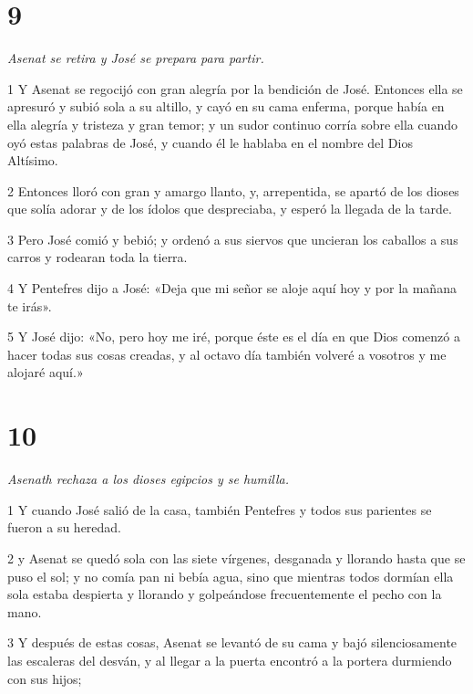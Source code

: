 \chapter{9}

\par \textit{Asenat se retira y José se prepara para partir.}

\par 1 Y Asenat se regocijó con gran alegría por la bendición de José. Entonces ella se apresuró y subió sola a su altillo, y cayó en su cama enferma, porque había en ella alegría y tristeza y gran temor; y un sudor continuo corría sobre ella cuando oyó estas palabras de José, y cuando él le hablaba en el nombre del Dios Altísimo.

\par 2 Entonces lloró con gran y amargo llanto, y, arrepentida, se apartó de los dioses que solía adorar y de los ídolos que despreciaba, y esperó la llegada de la tarde.

\par 3 Pero José comió y bebió; y ordenó a sus siervos que uncieran los caballos a sus carros y rodearan toda la tierra.

\par 4 Y Pentefres dijo a José: «Deja que mi señor se aloje aquí hoy y por la mañana te irás».

\par 5 Y José dijo: «No, pero hoy me iré, porque éste es el día en que Dios comenzó a hacer todas sus cosas creadas, y al octavo día también volveré a vosotros y me alojaré aquí.»

\chapter{10}

\par \textit{Asenath rechaza a los dioses egipcios y se humilla.}

\par 1 Y cuando José salió de la casa, también Pentefres y todos sus parientes se fueron a su heredad.

\par 2 y Asenat se quedó sola con las siete vírgenes, desganada y llorando hasta que se puso el sol; y no comía pan ni bebía agua, sino que mientras todos dormían ella sola estaba despierta y llorando y golpeándose frecuentemente el pecho con la mano.

\par 3 Y después de estas cosas, Asenat se levantó de su cama y bajó silenciosamente las escaleras del desván, y al llegar a la puerta encontró a la portera durmiendo con sus hijos;

